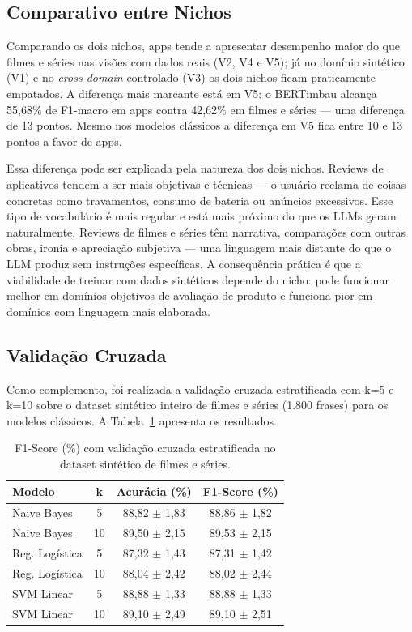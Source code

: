 \documentclass[12pt]{article}
\begin{document}
\subsection{Comparativo entre Nichos}

Comparando os dois nichos, apps tende a apresentar desempenho maior do que filmes e séries nas visões com dados reais (V2, V4 e V5); já no domínio sintético (V1) e no \textit{cross-domain} controlado (V3) os dois nichos ficam praticamente empatados. A diferença mais marcante está em V5: o BERTimbau alcança 55,68\% de F1-macro em apps contra 42,62\% em filmes e séries — uma diferença de 13 pontos. Mesmo nos modelos clássicos a diferença em V5 fica entre 10 e 13 pontos a favor de apps.

Essa diferença pode ser explicada pela natureza dos dois nichos. Reviews de aplicativos tendem a ser mais objetivas e técnicas — o usuário reclama de coisas concretas como travamentos, consumo de bateria ou anúncios excessivos. Esse tipo de vocabulário é mais regular e está mais próximo do que os LLMs geram naturalmente. Reviews de filmes e séries têm narrativa, comparações com outras obras, ironia e apreciação subjetiva — uma linguagem mais distante do que o LLM produz sem instruções específicas. A consequência prática é que a viabilidade de treinar com dados sintéticos depende do nicho: pode funcionar melhor em domínios objetivos de avaliação de produto e funciona pior em domínios com linguagem mais elaborada.

\subsection{Validação Cruzada}

Como complemento, foi realizada a validação cruzada estratificada com k=5 e k=10 sobre o dataset sintético inteiro de filmes e séries (1.800 frases) para os modelos clássicos. A Tabela~\ref{tab:cv} apresenta os resultados.

\begin{table}[h]
\centering
\caption{F1-Score (\%) com validação cruzada estratificada no dataset sintético de filmes e séries.}
\label{tab:cv}
\begin{tabular}{lccc}
\toprule
\textbf{Modelo} & \textbf{k} & \textbf{Acurácia (\%)} & \textbf{F1-Score (\%)} \\
\midrule
Naive Bayes    & 5  & 88,82 $\pm$ 1,83 & 88,86 $\pm$ 1,82 \\
Naive Bayes    & 10 & 89,50 $\pm$ 2,15 & 89,53 $\pm$ 2,15 \\
Reg. Logística & 5  & 87,32 $\pm$ 1,43 & 87,31 $\pm$ 1,42 \\
Reg. Logística & 10 & 88,04 $\pm$ 2,42 & 88,02 $\pm$ 2,44 \\
SVM Linear     & 5  & 88,88 $\pm$ 1,33 & 88,88 $\pm$ 1,33 \\
SVM Linear     & 10 & 89,10 $\pm$ 2,49 & 89,10 $\pm$ 2,51 \\
\bottomrule
\end{tabular}
\end{table}
\end{document}
